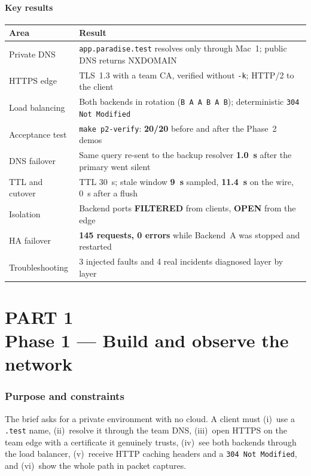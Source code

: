\documentclass[11pt,a4paper]{article}
\begin{document}
\subsection*{Key results}
\begin{table}[H]
\centering
{\small\renewcommand{\arraystretch}{1.25}
\begin{tabular}{@{}L{3.4cm}L{11.2cm}@{}}
\toprule
\textbf{Area} & \textbf{Result} \\
\midrule
Private DNS & \texttt{app.paradise.test} resolves only through Mac~1; public DNS returns NXDOMAIN \\
HTTPS edge & TLS~1.3 with a team CA, verified without \texttt{-k}; HTTP/2 to the client \\
Load balancing & Both backends in rotation (\texttt{B A A B A B}); deterministic \texttt{304 Not Modified} \\
Acceptance test & \texttt{make p2-verify}: \textbf{20/20} before and after the Phase~2 demos \\
DNS failover & Same query re-sent to the backup resolver \textbf{1.0~s} after the primary went silent \\
TTL and cutover & TTL 30~s; stale window \textbf{9~s} sampled, \textbf{11.4~s} on the wire, 0~s after a flush \\
Isolation & Backend ports \textbf{FILTERED} from clients, \textbf{OPEN} from the edge \\
HA failover & \textbf{145 requests, 0 errors} while Backend~A was stopped and restarted \\
Troubleshooting & 3 injected faults and 4 real incidents diagnosed layer by layer \\
\bottomrule
\end{tabular}}
\end{table}

\clearpage
\part*{{\large\color{lmTeal}PART 1}\protect\\[6pt]Phase 1 --- Build and observe the network}
\section{Purpose and constraints}
The brief asks for a private environment with no cloud. A client must (i)~use a
\texttt{.test} name, (ii)~resolve it through the team DNS, (iii)~open HTTPS on the team edge
with a certificate it genuinely trusts, (iv)~see both backends through the load balancer,
(v)~receive HTTP caching headers and a \texttt{304 Not Modified}, and (vi)~show the whole path
in packet captures.
\end{document}
